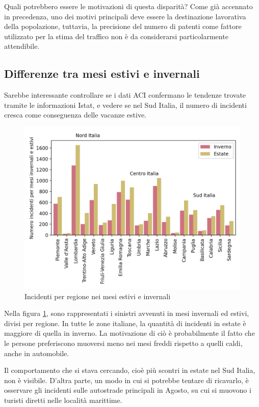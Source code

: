 \documentclass[a4paper,12pt]{report}
\begin{document}
Quali potrebbero essere le motivazioni di questa disparità?
Come già accennato in precedenza, uno dei motivi principali 
deve essere la destinazione lavorativa della popolazione, tuttavia, 
la precisione del numero di patenti come fattore utilizzato per la stima 
del traffico non è da considerarsi particolarmente attendibile.

\subsection{Differenze tra mesi estivi e invernali}

Sarebbe interessante controllare se i dati ACI confermano le tendenze trovate tramite 
le informazioni Istat, e vedere se nel Sud Italia, il numero di incidenti cresca 
come conseguenza delle vacanze estive.

\begin{figure}
    \includegraphics[width=\linewidth]{../src/incidenti/incidenti_aci/mappe_regioni/estate_inverno.png}
    \caption{Incidenti per regione nei mesi estivi e invernali}
    \label{fig:estate-inverno}
\end{figure}

Nella figura \ref{fig:estate-inverno}, sono rappresentati i sinistri avvenuti 
in mesi invernali ed estivi, divisi per regione. 
In tutte le zone italiane, la quantità di incidenti in estate è maggiore di quella 
in inverno. 
La motivazione di ciò è probabilmente il fatto che 
le persone preferiscono muoversi meno nei mesi freddi rispetto a quelli caldi, 
anche in automobile.

Il comportamento che si stava cercando, cioè più scontri in estate nel 
Sud Italia, non è visibile. 
D'altra parte, un modo in cui si potrebbe tentare di ricavarlo, è osservare gli 
incidenti sulle autostrade principali in Agosto, su cui si muovono i turisti diretti 
nelle località marittime.
\end{document}
